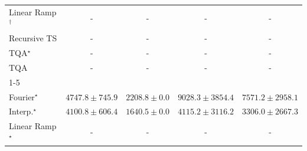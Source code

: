 \begin{tabular}{l|cccc|}
Linear Ramp$^\dagger$ & {\cellcolor[HTML]{000000}} \color[HTML]{F1F1F1} {\cellcolor{white}} \color{black} - & {\cellcolor[HTML]{000000}} \color[HTML]{F1F1F1} {\cellcolor{white}} \color{black} - & {\cellcolor[HTML]{000000}} \color[HTML]{F1F1F1} {\cellcolor{white}} \color{black} - & {\cellcolor[HTML]{000000}} \color[HTML]{F1F1F1} {\cellcolor{white}} \color{black} - \\
Recursive TS & {\cellcolor[HTML]{000000}} \color[HTML]{F1F1F1} {\cellcolor{white}} \color{black} - & {\cellcolor[HTML]{000000}} \color[HTML]{F1F1F1} {\cellcolor{white}} \color{black} - & {\cellcolor[HTML]{000000}} \color[HTML]{F1F1F1} {\cellcolor{white}} \color{black} - & {\cellcolor[HTML]{000000}} \color[HTML]{F1F1F1} {\cellcolor{white}} \color{black} - \\
TQA$^\star$ & {\cellcolor[HTML]{000000}} \color[HTML]{F1F1F1} {\cellcolor{white}} \color{black} - & {\cellcolor[HTML]{000000}} \color[HTML]{F1F1F1} {\cellcolor{white}} \color{black} - & {\cellcolor[HTML]{000000}} \color[HTML]{F1F1F1} {\cellcolor{white}} \color{black} - & {\cellcolor[HTML]{000000}} \color[HTML]{F1F1F1} {\cellcolor{white}} \color{black} - \\
TQA & {\cellcolor[HTML]{000000}} \color[HTML]{F1F1F1} {\cellcolor{white}} \color{black} - & {\cellcolor[HTML]{000000}} \color[HTML]{F1F1F1} {\cellcolor{white}} \color{black} - & {\cellcolor[HTML]{000000}} \color[HTML]{F1F1F1} {\cellcolor{white}} \color{black} - & {\cellcolor[HTML]{000000}} \color[HTML]{F1F1F1} {\cellcolor{white}} \color{black} - \\
\cline{1-5}
\multicolumn{5}{c}{\rule{0pt}{8pt}SV} \\
\midrule
Fourier$^\star$ & {\cellcolor[HTML]{96B6D7}} \color[HTML]{000000} $4747.8\pm 745.9$ & {\cellcolor[HTML]{F4EDF6}} \color[HTML]{000000} $2208.8\pm 0.0$ & {\cellcolor[HTML]{023B5D}} \color[HTML]{F1F1F1} $9028.3\pm 3854.4$ & {\cellcolor[HTML]{0569A4}} \color[HTML]{F1F1F1} $7571.2\pm 2958.1$ \\
Interp.$^\star$ & {\cellcolor[HTML]{B7C5DF}} \color[HTML]{000000} $4100.8\pm 606.4$ & {\cellcolor[HTML]{FFF7FB}} \color[HTML]{000000} $1640.5\pm 0.0$ & {\cellcolor[HTML]{B5C4DF}} \color[HTML]{000000} $4115.2\pm 3116.2$ & {\cellcolor[HTML]{D7D6E9}} \color[HTML]{000000} $3306.0\pm 2667.3$ \\
Linear Ramp$^\star$ & {\cellcolor[HTML]{000000}} \color[HTML]{F1F1F1} {\cellcolor{white}} \color{black} - & {\cellcolor[HTML]{000000}} \color[HTML]{F1F1F1} {\cellcolor{white}} \color{black} - & {\cellcolor[HTML]{000000}} \color[HTML]{F1F1F1} {\cellcolor{white}} \color{black} - & {\cellcolor[HTML]{000000}} \color[HTML]{F1F1F1} {\cellcolor{white}} \color{black} - \\

\end{tabular}
